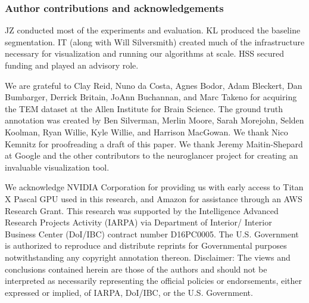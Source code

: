 \documentclass{article}
\begin{document}


\subsubsection*{Author contributions and acknowledgements}
JZ conducted most of the experiments and evaluation. KL produced the baseline segmentation. IT (along with
Will Silversmith) created much of the infrastructure necessary for visualization and running
our algorithms at scale. HSS secured funding and played an advisory role.

We are grateful to Clay Reid, Nuno da Costa, Agnes Bodor, Adam Bleckert, Dan Bumbarger, Derrick Britain, JoAnn Buchannan, and Marc Takeno for acquiring the TEM dataset at the Allen Institute for Brain Science.
The ground truth annotation was created by Ben Silverman, Merlin Moore, Sarah Morejohn, Selden Koolman, Ryan Willie, Kyle Willie, and Harrison MacGowan.
We thank Nico Kemnitz for proofreading a draft of this paper. We thank
Jeremy Maitin-Shepard at Google and the other contributors to the neuroglancer project for creating an invaluable visualization tool.

We acknowledge NVIDIA Corporation for providing us with early access to Titan X
Pascal GPU used in this research, and Amazon for assistance through an AWS Research Grant. This research was supported by the Intelligence Advanced
Research Projects Activity (IARPA) via Department of Interior/ Interior Business Center (DoI/IBC)
contract number D16PC0005. The U.S. Government is authorized to reproduce and distribute reprints
for Governmental purposes notwithstanding any copyright annotation thereon. Disclaimer: The views
and conclusions contained herein are those of the authors and should not be interpreted as necessarily
representing the official policies or endorsements, either expressed or implied, of IARPA, DoI/IBC,
or the U.S. Government.


\end{document}
